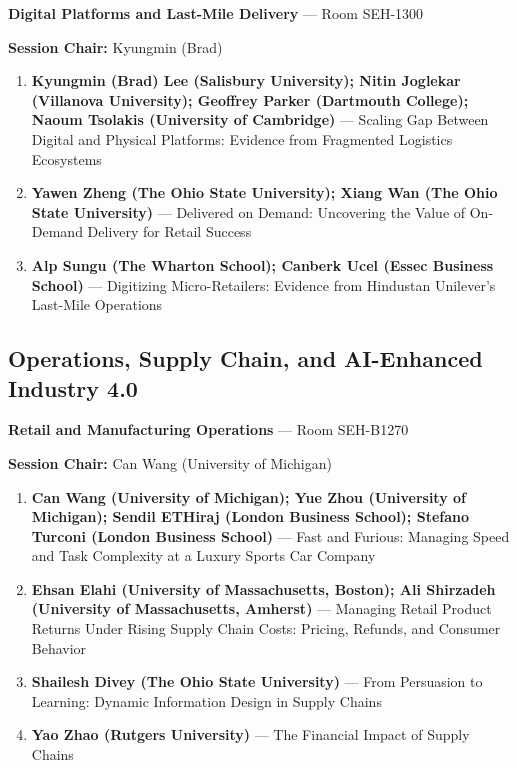 \documentclass[
  10pt,
  letterpaper,
  DIV=11,
  numbers=noendperiod]{scrartcl}
\begin{document}
\textbf{Digital Platforms and Last-Mile Delivery} --- Room SEH-1300

\textbf{Session Chair:} Kyungmin (Brad)

\begin{enumerate}
\def\labelenumi{\arabic{enumi}.}
\item
  \textbf{Kyungmin (Brad) Lee (Salisbury University); Nitin Joglekar
  (Villanova University); Geoffrey Parker (Dartmouth College); Naoum
  Tsolakis (University of Cambridge)} --- Scaling Gap Between Digital
  and Physical Platforms: Evidence from Fragmented Logistics Ecosystems
\item
  \textbf{Yawen Zheng (The Ohio State University); Xiang Wan (The Ohio
  State University)} --- Delivered on Demand: Uncovering the Value of
  On-Demand Delivery for Retail Success
\item
  \textbf{Alp Sungu (The Wharton School); Canberk Ucel (Essec Business
  School)} --- Digitizing Micro-Retailers: Evidence from Hindustan
  Unilever's Last-Mile Operations
\end{enumerate}

\subsection{\texorpdfstring{\textcolor{operations}{Operations, Supply Chain, and AI-Enhanced Industry 4.0}}{}}\label{section-12}

\textbf{Retail and Manufacturing Operations} --- Room SEH-B1270

\textbf{Session Chair:} Can Wang (University of Michigan)

\begin{enumerate}
\def\labelenumi{\arabic{enumi}.}
\item
  \textbf{Can Wang (University of Michigan); Yue Zhou (University of
  Michigan); Sendil ETHiraj (London Business School); Stefano Turconi
  (London Business School)} --- Fast and Furious: Managing Speed and
  Task Complexity at a Luxury Sports Car Company
\item
  \textbf{Ehsan Elahi (University of Massachusetts, Boston); Ali
  Shirzadeh (University of Massachusetts, Amherst)} --- Managing Retail
  Product Returns Under Rising Supply Chain Costs: Pricing, Refunds, and
  Consumer Behavior
\item
  \textbf{Shailesh Divey (The Ohio State University)} --- From
  Persuasion to Learning: Dynamic Information Design in Supply Chains
\item
  \textbf{Yao Zhao (Rutgers University)} --- The Financial Impact of
  Supply Chains
\end{enumerate}
\end{document}
